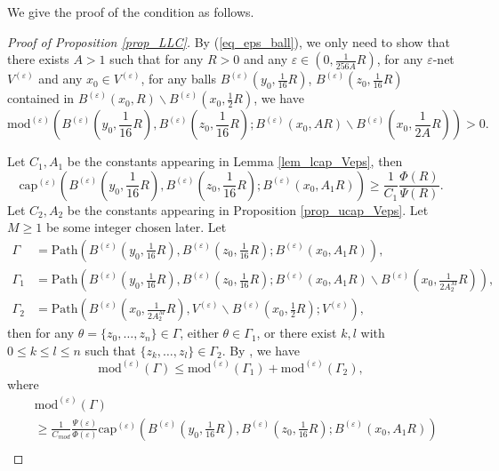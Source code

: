 \documentclass[11pt,a4paper]{article}
\numberwithin{equation}{section}
\theoremstyle{plain}
\theoremstyle{definition}
\begin{document}
We give the proof of the \hyperlink{eq_LLC}{} condition as follows.

\begin{proof}[Proof of Proposition \ref{prop_LLC}]
By (\ref{eq_eps_ball}), we only need to show that there exists $A>1$ such that for any $R>0$ and any $\varepsilon\in(0,\frac{1}{256A}R)$, for any $\varepsilon$-net $V^{(\varepsilon)}$ and any $x_0\in V^{(\varepsilon)}$, for any balls $B^{(\varepsilon)}(y_0,\frac{1}{16}R)$, $B^{(\varepsilon)}(z_0,\frac{1}{16}R)$ contained in $B^{(\varepsilon)}(x_0,R)\backslash B^{(\varepsilon)}(x_0,\frac{1}{2}R)$, we have
$$\mathrm{mod}^{(\varepsilon)}\left(B^{(\varepsilon)}(y_0,\frac{1}{16}R),B^{(\varepsilon)}(z_0,\frac{1}{16}R);B^{(\varepsilon)}(x_0,AR)\backslash B^{(\varepsilon)}(x_0,\frac{1}{2A}R)\right)>0.$$

Let $C_1,A_1$ be the constants appearing in Lemma \ref{lem_lcap_Veps}, then
$$\mathrm{cap}^{(\varepsilon)}\left(B^{(\varepsilon)}(y_0,\frac{1}{16}R),B^{(\varepsilon)}(z_0,\frac{1}{16}R);B^{(\varepsilon)}(x_0,A_1R)\right)\ge \frac{1}{C_1}\frac{\Phi(R)}{\Psi(R)}.$$
Let $C_2, A_2$ be the constants appearing in Proposition \ref{prop_ucap_Veps}. Let $M\ge1$ be some integer chosen later. Let
\begin{align*}
\Gamma&=\mathrm{Path}\left(B^{(\varepsilon)}(y_0,\frac{1}{16}R),B^{(\varepsilon)}(z_0,\frac{1}{16}R);B^{(\varepsilon)}(x_0,A_1R)\right),\\
\Gamma_1&=\mathrm{Path}\left(B^{(\varepsilon)}(y_0,\frac{1}{16}R),B^{(\varepsilon)}(z_0,\frac{1}{16}R);B^{(\varepsilon)}(x_0,A_1R)\backslash B^{(\varepsilon)}(x_0,\frac{1}{2A_2^M}R)\right),\\
\Gamma_2&=\mathrm{Path}\left(B^{(\varepsilon)}(x_0,\frac{1}{2A_2^{M}}R),V^{(\varepsilon)}\backslash B^{(\varepsilon)}(x_0,\frac{1}{2}R);V^{(\varepsilon)}\right),
\end{align*}
then for any $\theta=\{z_0,\ldots,z_n\}\in\Gamma$, either $\theta\in\Gamma_1$, or there exist $k,l$ with $0\le k\le l\le n$ such that $\{z_k,\ldots,z_l\}\in\Gamma_2$. By \cite[Lemma 2.3 (iii) (iv)]{MS25}, we have
\begin{equation}\label{eq_LLC1}
\mathrm{mod}^{(\varepsilon)}(\Gamma)\le\mathrm{mod}^{(\varepsilon)}(\Gamma_1)+\mathrm{mod}^{(\varepsilon)}(\Gamma_2),
\end{equation}
where
\begin{align}
&\mathrm{mod}^{(\varepsilon)}(\Gamma)\nonumber\\
&\ge \frac{1}{C_{mod}}\frac{\Psi(\varepsilon)}{\Phi(\varepsilon)}\mathrm{cap}^{(\varepsilon)}\left(B^{(\varepsilon)}(y_0,\frac{1}{16}R),B^{(\varepsilon)}(z_0,\frac{1}{16}R);B^{(\varepsilon)}(x_0,A_1R)\right)\nonumber\\

\end{align}
\end{proof}
\end{document}
